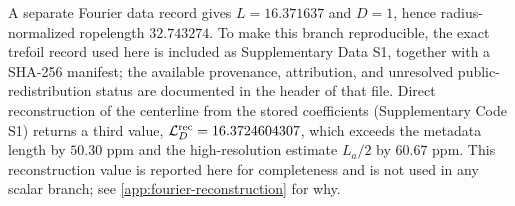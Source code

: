 \documentclass[aps,pre,preprint,notitlepage,nofootinbib,superscriptaddress]{revtex4-2}
\newcommand{\calL}{\mathcal L}
\begin{document}
A separate Fourier data record gives $L=16.371637$ and $D=1$, hence radius-normalized ropelength $32.743274$.  To make this branch reproducible, the exact trefoil record used here is included as Supplementary Data S1, together with a SHA-256 manifest; the available provenance, attribution, and unresolved public-redistribution status are documented in the header of that file.  Direct reconstruction of the centerline from the stored coefficients (Supplementary Code S1) returns a third value, $\calL_D^{\rm rec}=16.3724604307$, which exceeds the metadata length by $50.30$ ppm and the high-resolution estimate $L_a/2$ by $60.67$ ppm.  This reconstruction value is reported here for completeness and is not used in any scalar branch; see \cref{app:fourier-reconstruction} for why.


\begin{figure}[t]
\centering
{}
\end{figure}
\end{document}
